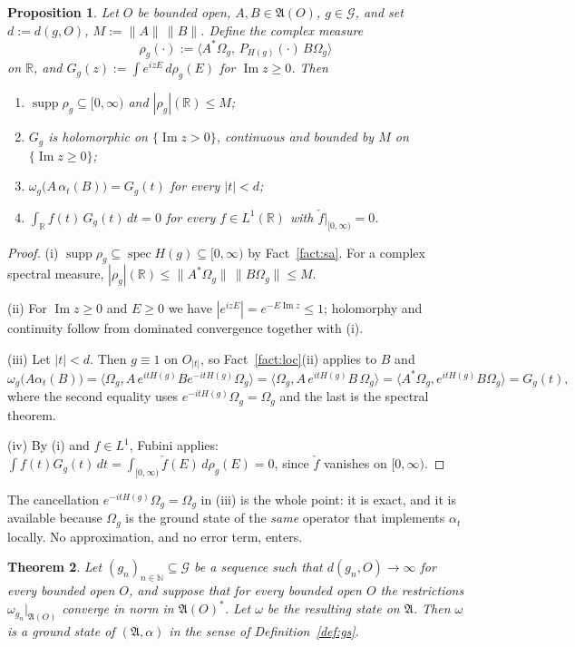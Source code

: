 \documentclass[11pt,a4paper]{article}
\theoremstyle{plain}
\newtheorem{theorem}{Theorem}[section]
\newtheorem{proposition}[theorem]{Proposition}
\theoremstyle{definition}
\newcommand{\A}{\mathfrak{A}}
\newcommand{\G}{\mathcal{G}}
\newcommand{\R}{\mathbb{R}}
\newcommand{\Om}{\Omega}
\newcommand{\ip}[2]{\langle #1,#2\rangle}
\DeclareMathOperator{\spec}{spec}
\DeclareMathOperator{\supp}{supp}
\begin{document}
\begin{proposition}\label{prop:exact}
Let $O$ be bounded open, $A,B\in\A(O)$, $g\in\G$, and set $d:=d(g,O)$, $M:=\|A\|\,\|B\|$. Define
the complex measure
\[
  \rho_g(\cdot):=\ip{A^*\Om_g}{\,P_{H(g)}(\cdot)\,B\Om_g}
\]
on $\R$, and $G_g(z):=\int e^{izE}\,d\rho_g(E)$ for $\operatorname{Im}z\ge0$. Then
\begin{enumerate}
\item[\rm(i)] $\supp\rho_g\subseteq[0,\infty)$ and $|\rho_g|(\R)\le M$;
\item[\rm(ii)] $G_g$ is holomorphic on $\{\operatorname{Im}z>0\}$, continuous and bounded by $M$
      on $\{\operatorname{Im}z\ge0\}$;
\item[\rm(iii)] $\omega_g\bigl(A\,\alpha_t(B)\bigr)=G_g(t)$ for every $|t|<d$;
\item[\rm(iv)] $\displaystyle\int_\R f(t)\,G_g(t)\,dt=0$ for every $f\in L^1(\R)$ with
      $\check f|_{[0,\infty)}=0$.
\end{enumerate}
\end{proposition}

\begin{proof}
(i) $\supp\rho_g\subseteq\spec H(g)\subseteq[0,\infty)$ by Fact~\ref{fact:sa}. For a complex
spectral measure, $|\rho_g|(\R)\le\|A^*\Om_g\|\,\|B\Om_g\|\le M$.

(ii) For $\operatorname{Im}z\ge0$ and $E\ge0$ we have $|e^{izE}|=e^{-E\operatorname{Im}z}\le1$;
holomorphy and continuity follow from dominated convergence together with (i).

(iii) Let $|t|<d$. Then $g\equiv1$ on $O_{|t|}$, so Fact~\ref{fact:loc}(ii) applies to $B$ and
\[
  \omega_g\bigl(A\alpha_t(B)\bigr)
  =\ip{\Om_g}{A\,e^{itH(g)}Be^{-itH(g)}\Om_g}
  =\ip{\Om_g}{A\,e^{itH(g)}B\,\Om_g}
  =\ip{A^*\Om_g}{e^{itH(g)}B\Om_g}
  =G_g(t),
\]
where the second equality uses $e^{-itH(g)}\Om_g=\Om_g$ and the last is the spectral theorem.

(iv) By (i) and $f\in L^1$, Fubini applies:
$\int f(t)G_g(t)\,dt=\int_{[0,\infty)}\check f(E)\,d\rho_g(E)=0$, since $\check f$ vanishes on
$[0,\infty)$.
\end{proof}

The cancellation $e^{-itH(g)}\Om_g=\Om_g$ in (iii) is the whole point: it is exact, and it is
available because $\Om_g$ is the ground state of the \emph{same} operator that implements
$\alpha_t$ locally. No approximation, and no error term, enters.

\begin{theorem}\label{thm:main}
Let $(g_n)_{n\in\mathbb N}\subseteq\G$ be a sequence such that $d(g_n,O)\to\infty$ for every
bounded open $O$, and suppose that for every bounded open $O$ the restrictions
$\omega_{g_n}|_{\A(O)}$ converge in \emph{norm} in $\A(O)^*$. Let $\omega$ be the resulting state
on $\A$. Then $\omega$ is a ground state of $(\A,\alpha)$ in the sense of
Definition~\ref{def:gs}.
\end{theorem}
\end{document}
